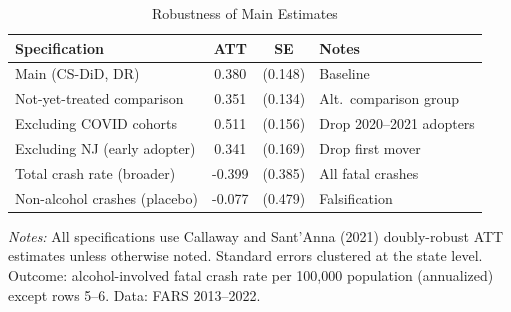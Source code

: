 \begin{table}[t]
\centering
\caption{Robustness of Main Estimates}
\label{tab:robustness}
\small
\begin{tabular}{lccl}
\hline\hline
Specification & ATT & SE & Notes \\
\hline
Main (CS-DiD, DR) & 0.380 & (0.148) & Baseline \\
Not-yet-treated comparison & 0.351 & (0.134) & Alt.\ comparison group \\
Excluding COVID cohorts & 0.511 & (0.156) & Drop 2020--2021 adopters \\
Excluding NJ (early adopter) & 0.341 & (0.169) & Drop first mover \\
Total crash rate (broader) & -0.399 & (0.385) & All fatal crashes \\
Non-alcohol crashes (placebo) & -0.077 & (0.479) & Falsification \\
\hline\hline
\end{tabular}
\begin{tablenotes}
\item \textit{Notes:} All specifications use Callaway and Sant'Anna (2021) doubly-robust ATT estimates unless otherwise noted. Standard errors clustered at the state level. Outcome: alcohol-involved fatal crash rate per 100,000 population (annualized) except rows 5--6. Data: FARS 2013--2022.
\end{tablenotes}
\end{table}
